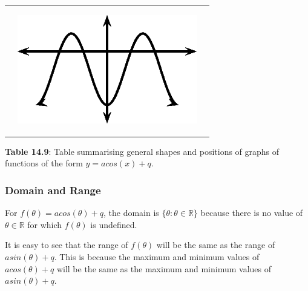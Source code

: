 \begin{center}
\begin{xtabular*}{\mytablewidth}[t]{|p{10\mystarwidth}|p{10\mystarwidth}|p{10\mystarwidth}|}
\begin{center}
    \end{center}    
                 &
    \setcounter{subfigure}{0}
\label{m39414*id88246}
    \begin{center}
    \label{m39414*id88246!!!underscore!!!media}\label{m39414*id88246!!!underscore!!!printimage}\includegraphics{col11306.imgs/m39414_MG10C15_029.png} %
      \vspace{2pt}
    \vspace{.1in}
    \end{center}    
     \tabularnewline{}
    \end{xtabular*}
      \end{center}
    \begin{center}{\small\bfseries Table 14.9}: Table summarising general shapes and positions of graphs of functions of the form $y=acos\left(x\right)+q$.\end{center}
    \par
        \label{m39414*uid66}
            \subsubsection{ Domain and Range}
            \nopagebreak
          \label{m39414*id88263}For $f\left(\theta \right)=acos\left(\theta \right)+q$, the domain is $\{\theta :\theta \in \mathbb{R}\}$ because there is no value of $\theta \in \mathbb{R}$ for which $f\left(\theta \right)$ is undefined.\par 
          \label{m39414*id88363}It is easy to see that the range of $f\left(\theta \right)$ will be the same as the range of $asin\left(\theta \right)+q$. This is because the maximum and minimum values of $acos\left(\theta \right)+q$ will be the same as the maximum and minimum values of $asin\left(\theta \right)+q$.\par 
        \label{m39414*uid67}
